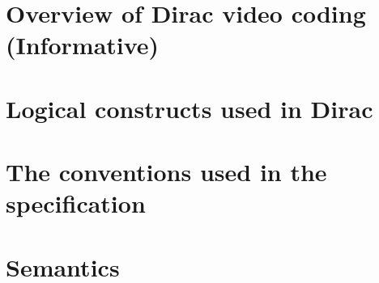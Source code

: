 
\section{Overview of Dirac video coding (Informative)}

\clearpage
\section{Logical constructs used in Dirac}

\clearpage
\section{The conventions used in the specification}

\clearpage
\section{Semantics}
